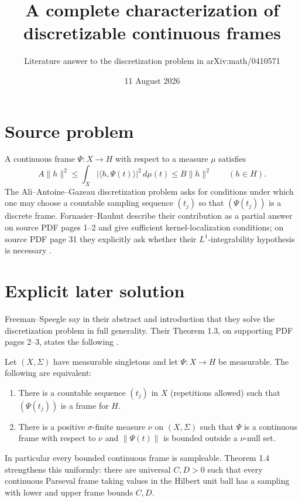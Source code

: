\documentclass[11pt]{article}
\title{A complete characterization of discretizable continuous frames}
\author{Literature answer to the discretization problem in arXiv:math/0410571}
\date{11 August 2026}
\begin{document}
\maketitle

\begin{center}
\end{center}

\section*{Source problem}
A continuous frame $\Psi:X\to H$ with respect to a measure $\mu$ satisfies
\[
 A\|h\|^2\le \int_X |\langle h,\Psi(t)\rangle|^2\,d\mu(t)
 \le B\|h\|^2 \qquad(h\in H).
\]
The Ali--Antoine--Gazeau discretization problem asks for conditions under which one may choose a countable sampling sequence $(t_j)$ so that $(\Psi(t_j))$ is a discrete frame.  Fornasier--Rauhut describe their contribution as a partial answer on source PDF pages 1--2 and give sufficient kernel-localization conditions; on source PDF page 31 they explicitly ask whether their $L^1$-integrability hypothesis is necessary \cite{FR}.

\section*{Explicit later solution}
Freeman--Speegle say in their abstract and introduction that they solve the discretization problem in full generality.  Their Theorem 1.3, on supporting PDF pages 2--3, states the following \cite{FS}.

Let $(X,\Sigma)$ have measurable singletons and let $\Psi:X\to H$ be measurable.  The following are equivalent:
\begin{enumerate}
\item There is a countable sequence $(t_j)$ in $X$ (repetitions allowed) such that $(\Psi(t_j))$ is a frame for $H$.
\item There is a positive $\sigma$-finite measure $\nu$ on $(X,\Sigma)$ such that $\Psi$ is a continuous frame with respect to $\nu$ and $\|\Psi(t)\|$ is bounded outside a $\nu$-null set.
\end{enumerate}
In particular every bounded continuous frame is sampleable.  Theorem 1.4 strengthens this uniformly: there are universal $C,D>0$ such that every continuous Parseval frame taking values in the Hilbert unit ball has a sampling with lower and upper frame bounds $C,D$.
\end{document}
